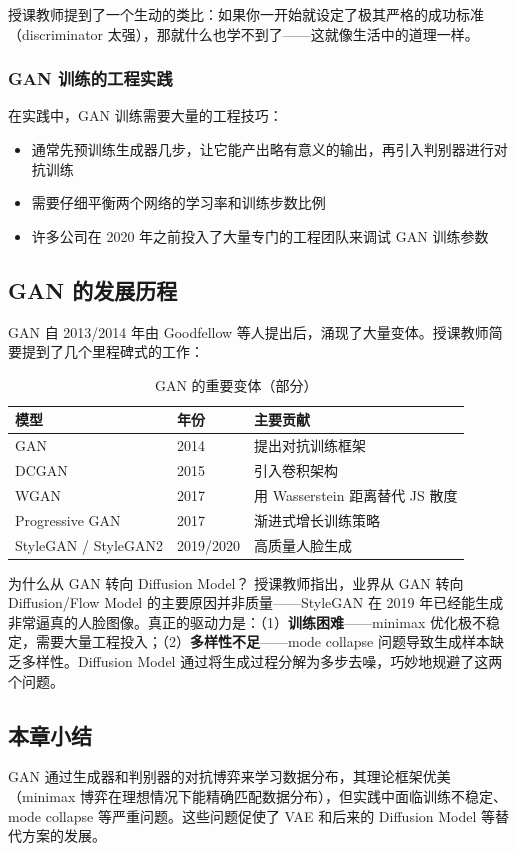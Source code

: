授课教师提到了一个生动的类比：如果你一开始就设定了极其严格的成功标准（discriminator 太强），那就什么也学不到了——这就像生活中的道理一样。

\subsubsection{GAN 训练的工程实践}

在实践中，GAN 训练需要大量的工程技巧：

\begin{itemize}
    \item 通常先预训练生成器几步，让它能产出略有意义的输出，再引入判别器进行对抗训练
    \item 需要仔细平衡两个网络的学习率和训练步数比例
    \item 许多公司在 2020 年之前投入了大量专门的工程团队来调试 GAN 训练参数
\end{itemize}

\subsection{GAN 的发展历程}

GAN 自 2013/2014 年由 Goodfellow 等人提出后，涌现了大量变体。授课教师简要提到了几个里程碑式的工作：

\begin{table}[H]
\centering
\begin{tabular}{lll}
\toprule
模型 & 年份 & 主要贡献 \\
\midrule
GAN & 2014 & 提出对抗训练框架 \\
DCGAN & 2015 & 引入卷积架构 \\
WGAN & 2017 & 用 Wasserstein 距离替代 JS 散度 \\
Progressive GAN & 2017 & 渐进式增长训练策略 \\
StyleGAN / StyleGAN2 & 2019/2020 & 高质量人脸生成 \\
\bottomrule
\end{tabular}
\caption{GAN 的重要变体（部分）}
\end{table}

\begin{knowledgebox}{为什么从 GAN 转向 Diffusion Model？}
授课教师指出，业界从 GAN 转向 Diffusion/Flow Model 的主要原因并非质量——StyleGAN 在 2019 年已经能生成非常逼真的人脸图像。真正的驱动力是：（1）\textbf{训练困难}——minimax 优化极不稳定，需要大量工程投入；（2）\textbf{多样性不足}——mode collapse 问题导致生成样本缺乏多样性。Diffusion Model 通过将生成过程分解为多步去噪，巧妙地规避了这两个问题。
\end{knowledgebox}

\subsection{本章小结}

GAN 通过生成器和判别器的对抗博弈来学习数据分布，其理论框架优美（minimax 博弈在理想情况下能精确匹配数据分布），但实践中面临训练不稳定、mode collapse 等严重问题。这些问题促使了 VAE 和后来的 Diffusion Model 等替代方案的发展。

\newpage
